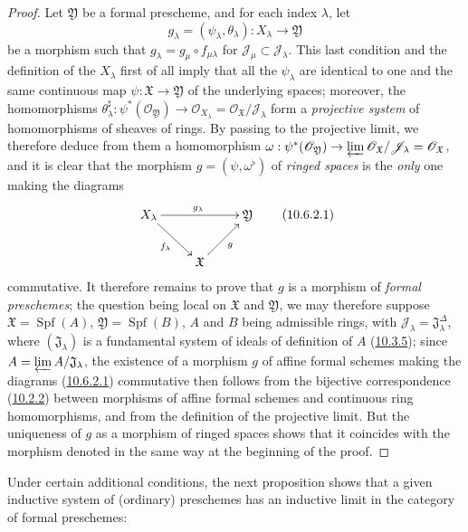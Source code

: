 \begin{proof}
Let $\mathfrak{Y}$ be a formal prescheme, and for each index $\lambda$,
let
\[
  g_\lambda=(\psi_\lambda,\theta_\lambda):X_\lambda\to\mathfrak{Y}
\]
be a morphism such that
$g_\lambda=g_\mu\circ f_{\mu\lambda}$ for
$\mathscr{J}_\mu\subset\mathscr{J}_\lambda$. This last condition
and the definition of the $X_\lambda$ first of all imply that all the
$\psi_\lambda$ are identical to one and the same continuous map
$\psi:\mathfrak{X}\to\mathfrak{Y}$ of the underlying spaces; moreover,
the homomorphisms
$\theta_\lambda^\sharp:\psi^*(\mathscr{O}_{\mathfrak{Y}})\to
\mathscr{O}_{X_\lambda}=
\mathscr{O}_{\mathfrak{X}}/\mathscr{J}_\lambda$ form a
\emph{projective system} of homomorphisms of sheaves of rings. By
passing to the projective limit, we therefore deduce from them a
homomorphism $\omega:\psi^*(\mathscr{O}_{\mathfrak{Y}})\to
  \varprojlim\mathscr{O}_{\mathfrak{X}}/\mathscr{J}_\lambda
  =\mathscr{O}_{\mathfrak{X}}$,
and it is clear that the morphism $g=(\psi,\omega^\flat)$ of \emph{ringed
spaces} is the \emph{only} one making the diagrams
\[
  \label{I.10.6.2.1}
  \xymatrix{
    X_\lambda\ar[rr]^{g_\lambda}\ar[rd]_{f_\lambda} &&
    \mathfrak{Y}\\
    & \mathfrak{X}\ar[ru]_g
  }
  \tag{10.6.2.1}
\]
commutative. It therefore remains to prove that $g$ is a morphism of
\emph{formal preschemes}; the question being local on $\mathfrak{X}$ and
$\mathfrak{Y}$, we may therefore suppose
$\mathfrak{X}=\operatorname{Spf}(A)$,
$\mathfrak{Y}=\operatorname{Spf}(B)$, $A$ and $B$ being admissible
rings, with
$\mathscr{J}_\lambda=\mathfrak{J}_\lambda^{\Delta}$, where
$(\mathfrak{J}_\lambda)$ is a fundamental system of ideals of
definition of $A$ (\hyperref[I.10.3.5]{10.3.5}); since
$A=\varprojlim A/\mathfrak{J}_\lambda$, the existence of a morphism $g$
of affine formal schemes making the diagrams
(\hyperref[I.10.6.2.1]{10.6.2.1}) commutative then follows from the
bijective correspondence (\hyperref[I.10.2.2]{10.2.2}) between
morphisms of affine formal schemes and continuous ring homomorphisms,
and from the definition of the projective limit. But the uniqueness of
$g$ as a morphism of ringed spaces shows that it coincides with the
morphism denoted in the same way at the beginning of the proof.
\end{proof}

Under certain additional conditions, the next proposition shows that a given
inductive system of (ordinary) preschemes has an inductive limit in the
category of formal preschemes:

